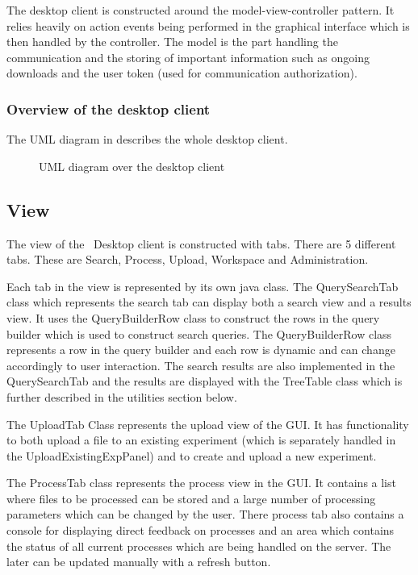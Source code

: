 The desktop client is constructed around the model-view-controller pattern. It relies heavily on action events being performed in the graphical interface which is then handled by the controller. The model is the part handling the communication and the storing of important information such as ongoing downloads and the user token (used for communication authorization).

\subsubsection{Overview of the desktop client}
The UML diagram in  describes the whole desktop client.
\begin{figure}[htb!]
	\caption{UML diagram over the desktop client}
	\label{fig:des_uml-overview}
\end{figure}


\subsection{View}
The view of the \appName\ Desktop client is constructed with tabs. There are 5 different tabs. These are Search, Process, Upload, Workspace and Administration.

Each tab in the view is represented by its own java class. The QuerySearchTab class which represents the search tab can display both a search view and a results view. It uses the QueryBuilderRow class to construct the rows in the query builder which is used to construct search queries. The QueryBuilderRow class represents a row in the query builder and each row is dynamic and can change accordingly to user interaction. The search results are also implemented in the QuerySearchTab and the results are displayed with the TreeTable class which is further described in the utilities section below.

The UploadTab Class represents the upload view of the GUI. It has functionality to both upload a file to an existing experiment (which is separately handled in the UploadExistingExpPanel) and to create and upload a new experiment.

The ProcessTab class represents the process view in the GUI. It contains a list where files to be processed can be stored and a large number of processing parameters which can be changed by the user. There process tab also contains a console for displaying direct feedback on processes and an area which contains the status of all current processes which are being handled on the server. The later can be updated manually with a refresh button.

